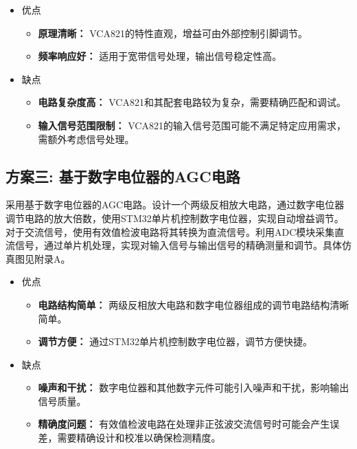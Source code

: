 \documentclass[lang=cn,11pt,a4paper]{elegantpaper}
\begin{document}
\begin{itemize}
  \item 优点
        \begin{itemize}
          \item \textbf{原理清晰：} VCA821的特性直观，增益可由外部控制引脚调节。
          \item \textbf{频率响应好：} 适用于宽带信号处理，输出信号稳定性高。
        \end{itemize}

  \item 缺点
        \begin{itemize}
          \item \textbf{电路复杂度高：} VCA821和其配套电路较为复杂，需要精确匹配和调试。
          \item \textbf{输入信号范围限制：} VCA821的输入信号范围可能不满足特定应用需求，需额外考虑信号处理。
        \end{itemize}
\end{itemize}

\subsection{方案三: 基于数字电位器的AGC电路}

采用基于数字电位器的AGC电路。设计一个两级反相放大电路，通过数字电位器调节电路的放大倍数，使用STM32单片机控制数字电位器，实现自动增益调节。对于交流信号，使用有效值检波电路将其转换为直流信号。利用ADC模块采集直流信号，通过单片机处理，实现对输入信号与输出信号的精确测量和调节。具体仿真图见附录A。


\begin{itemize}
  \item  优点
        \begin{itemize}
          \item \textbf{电路结构简单：} 两级反相放大电路和数字电位器组成的调节电路结构清晰简单。
          \item \textbf{调节方便：} 通过STM32单片机控制数字电位器，调节方便快捷。
        \end{itemize}

  \item 缺点
        \begin{itemize}
          \item \textbf{噪声和干扰：} 数字电位器和其他数字元件可能引入噪声和干扰，影响输出信号质量。
          \item \textbf{精确度问题：} 有效值检波电路在处理非正弦波交流信号时可能会产生误差，需要精确设计和校准以确保检测精度。
        \end{itemize}
\end{itemize}
\end{document}

